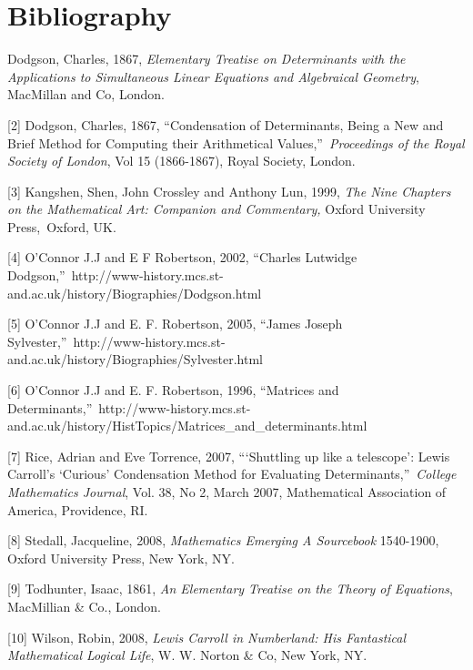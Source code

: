 \documentclass[11pt]{article}%
\theoremstyle{definition}
\begin{document}
\section{Bibliography}

\begin{flushleft}
[1] Dodgson, Charles, 1867, \textit{Elementary Treatise on Determinants with
the Applications to Simultaneous Linear Equations and Algebraical Geometry},
MacMillan and Co, London.

\bigskip

[2] Dodgson, Charles, 1867, \textquotedblleft Condensation of Determinants,
Being a New and Brief Method for Computing their Arithmetical
Values,\textquotedblright\ \textit{Proceedings of the Royal Society of
London}, Vol 15 (1866-1867), Royal Society, London.

\bigskip

[3] Kangshen, Shen, John Crossley and Anthony Lun, 1999, \textit{The Nine
Chapters on the Mathematical Art: Companion and Commentary, }Oxford University
Press,\ Oxford, UK.\textit{ }

\bigskip

[4] O'Connor J.J and E F Robertson, 2002, \textquotedblleft Charles Lutwidge
Dodgson,\textquotedblright\ http://www-history.mcs.st-and.ac.uk/history/Biographies/Dodgson.html

\bigskip

[5] O'Connor J.J and E. F. Robertson, 2005, \textquotedblleft James Joseph
Sylvester,\textquotedblright\ http://www-history.mcs.st-and.ac.uk/history/Biographies/Sylvester.html

\bigskip

[6] O'Connor J.J and E. F. Robertson, 1996, \textquotedblleft Matrices and
Determinants,\textquotedblright\ http://www-history.mcs.st-and.ac.uk/history/HistTopics/Matrices\_and\_determinants.html

\bigskip

[7] Rice, Adrian and Eve Torrence, 2007, \textquotedblleft`Shuttling up like a
telescope': Lewis Carroll's `Curious' Condensation Method for Evaluating
Determinants,\textquotedblright\ \textit{College Mathematics Journal}, Vol.
38, No 2, March 2007, Mathematical Association of America, Providence, RI.

\bigskip

[8] Stedall, Jacqueline, 2008, \textit{Mathematics Emerging A Sourcebook}
1540-1900, Oxford University Press, New York, NY.

\bigskip

[9] Todhunter, Isaac, 1861, \textit{An Elementary Treatise on the Theory of
Equations}, MacMillian \& Co., London.

\bigskip

[10] Wilson, Robin, 2008, \textit{Lewis Carroll in Numberland: His Fantastical
Mathematical Logical Life}, W. W. Norton \& Co, New York, NY.
\end{flushleft}
\end{document}
